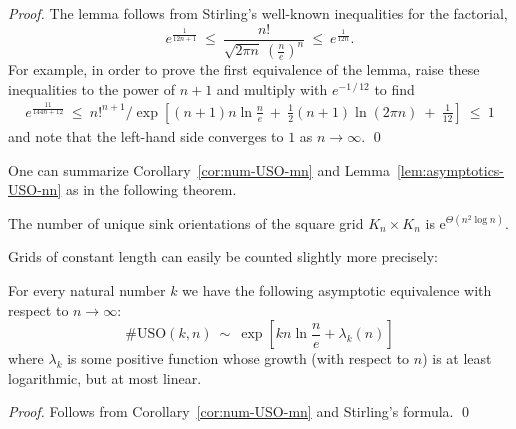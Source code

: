 \documentclass[runningheads,a4paper]{llncs}
\newcommand{\USO}{\ensuremath{\mathrm{USO}}}
\newcommand{\e}{\ensuremath{\mathrm{e}}}
\begin{document}
\begin{proof}
    The lemma follows from Stirling's well-known inequalities for the factorial,
    \[
        e ^ \frac{1}{12n+1}
        ~\le~
        \frac{ n! }{ \sqrt{2 \pi n} ~ \left( \frac{n}{e} \right) ^ n }
        ~\le~
        e ^ \frac{1}{12n} .
    \]
    For example, in order to prove the first equivalence of the lemma, raise
    these inequalities to the power of $n+1$ and multiply with
    $e ^ { -1\,/\,12 }$ to find
    \begin{align*}
        e ^ \frac{11}{144n+12}
        ~\le~
        n!^{n+1} / \exp \left[
                                    (n+1) n \ln \frac{n}{e} ~+~
                                    \frac{1}{2} (n+1) \ln (2 \pi n)
                                    ~+~ \frac{1}{12} \right]
        ~\le~
        1
    \end{align*}
    and note that the left-hand side converges to $1$ as $n \to \infty$.
    \qed
\end{proof}

One can summarize Corollary~\ref{cor:num-USO-mn} and
Lemma~\ref{lem:asymptotics-USO-nn} as in the following theorem.

\begin{theorem}
    \label{thm:asymptotics-USO-nn}
    The number of unique sink orientations of the square grid $K_n \times K_n$
    is $\e ^ { \Theta(n^2 \log n) }$.
\end{theorem}

Grids of constant length can easily be counted slightly more precisely:

\begin{proposition}
    \label{prop:asymptotics-USO-kn}
    For every natural number $k$ we have the following asymptotic
    equivalence with respect to $n \to \infty$:
    \[
        \#\USO(k,n) ~\sim~ \exp\left[
            k n \ln \frac{n}{e} + \lambda_k(n)
        \right]
    \]
    where $\lambda_k$ is some positive function whose growth (with respect to
    $n$) is at least logarithmic, but at most linear.
\end{proposition}

\begin{proof}
    Follows from Corollary~\ref{cor:num-USO-mn} and Stirling's formula. \qed
\end{proof}



\end{document}
